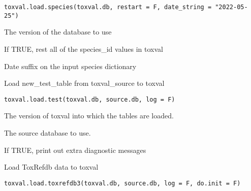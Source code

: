 \documentclass[letterpaper]{book}
\begin{document}
%
\begin{Usage}
\begin{verbatim}
toxval.load.species(toxval.db, restart = F, date_string = "2022-05-25")
\end{verbatim}
\end{Usage}
%
\begin{Arguments}
\begin{ldescription}
\item[\code{toxval.db}] The version of the database to use

\item[\code{restart}] If TRUE, rest all of the species\_id values in toxval

\item[\code{date.string}] Date suffix on the input species dictionary
\end{ldescription}
\end{Arguments}
%
\begin{Description}\relax
Load new\_test\_table from toxval\_source to toxval
\end{Description}
%
\begin{Usage}
\begin{verbatim}
toxval.load.test(toxval.db, source.db, log = F)
\end{verbatim}
\end{Usage}
%
\begin{Arguments}
\begin{ldescription}
\item[\code{toxval.db}] The version of toxval into which the tables are loaded.

\item[\code{source.db}] The source database to use.

\item[\code{verbose}] If TRUE, print out extra diagnostic messages
\end{ldescription}
\end{Arguments}
%
\begin{Description}\relax
Load ToxRefdb data to toxval
\end{Description}
%
\begin{Usage}
\begin{verbatim}
toxval.load.toxrefdb3(toxval.db, source.db, log = F, do.init = F)
\end{verbatim}
\end{Usage}
\end{document}
